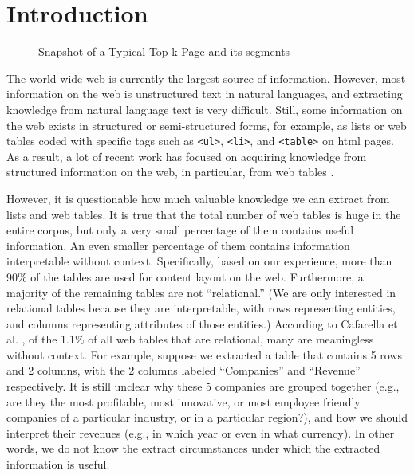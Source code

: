 \section{Introduction}
\label{sec:intro}


\begin{figure*}[th]
        \centering
	\vspace*{-2ex}
        \caption{Snapshot of a Typical Top-k Page
          \cite{dotNetAwards} and its segments}
 	\label{fig:dotNet}
	\vspace*{-2ex}
\end{figure*}

The world wide web is currently the largest source of
information. However, most information on the web is unstructured text
in natural languages, and extracting knowledge from natural language
text is very difficult. Still, some information on the web exists in
structured or semi-structured forms, for example, as lists or web
tables coded with specific tags such as {\tt <ul>}, {\tt <li>}, and
{\tt <table>} on html pages. As a result, a lot of recent work has
focused on acquiring knowledge from structured information on the web,
in particular, from web tables
\cite{googlesets,webtables08,LiuGZ03:MDR,MiaoTHSM09:TagPathClustering,GatterbauerBHKP2007:Towards,FumarolaWBMH11:List,WangWWZ12:Tables}.

However, it is questionable how much valuable knowledge we can extract
from lists and web tables. It is true that the total number of web
tables is huge in the entire corpus, but only a very small percentage
of them contains useful information. An even smaller percentage of
them contains information interpretable without context. Specifically,
based on our experience, more than 90\% of the tables are used for
content layout on the web. Furthermore, a majority of the remaining
tables are not ``relational.'' (We are only interested in relational
tables because they are interpretable, with rows representing
entities, and columns representing attributes of those entities.)
According to Cafarella et al. \cite{webtables08}, 
of the 1.1\% of all web tables that are relational, many
are meaningless without context.  For example, suppose we
extracted a table that contains 5 rows and 2 columns, with the 2
columns labeled ``Companies'' and ``Revenue'' respectively. It is
still unclear why these 5 companies are grouped together (e.g., are
they the most profitable, most innovative, or most employee friendly
companies of a particular industry, or in a particular region?), and how
we should interpret their revenues (e.g., in which year or even in
what currency). In other words, we do not know the extract circumstances
under which the extracted information is useful.

